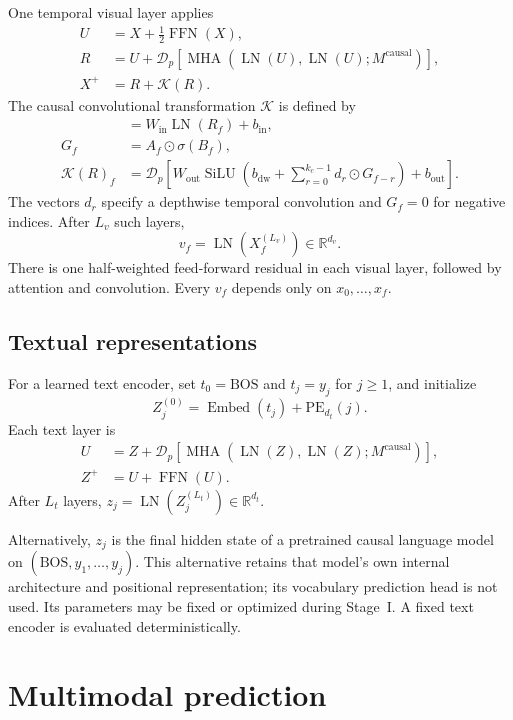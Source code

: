 \documentclass[11pt,a4paper]{article}
\newcommand{\R}{\mathbb{R}}
\newcommand{\LN}{\operatorname{LN}}
\newcommand{\MHA}{\operatorname{MHA}}
\newcommand{\FFN}{\operatorname{FFN}}
\newcommand{\silu}{\operatorname{SiLU}}
\newcommand{\BOS}{\mathrm{BOS}}
\numberwithin{equation}{section}
\begin{document}
One temporal visual layer applies
\begin{align}
U&=X+\tfrac12\FFN(X),\\
R&=U+\mathcal D_p\!\left[
 \MHA(\LN(U),\LN(U);M^{\mathrm{causal}})\right],\\
X^{+}&=R+\mathcal K(R).
\label{eq:visual-layer}
\end{align}
The causal convolutional transformation $\mathcal K$ is defined by
\begin{align}
[A_f,B_f]&=W_{\mathrm{in}}\LN(R_f)+b_{\mathrm{in}},\\
G_f&=A_f\odot\sigma(B_f),\\
\mathcal K(R)_f
 &=\mathcal D_p\!\left[
 W_{\mathrm{out}}\silu\!\left(
 b_{\mathrm{dw}}+\sum_{r=0}^{k_c-1}d_r\odot G_{f-r}\right)
 +b_{\mathrm{out}}\right].
\end{align}
The vectors $d_r$ specify a depthwise temporal convolution and
$G_f=0$ for negative indices. After $L_v$ such layers,
\begin{equation}
v_f=\LN(X_f^{(L_v)})\in\R^{d_v}.
\end{equation}
There is one half-weighted feed-forward residual in each visual layer,
followed by attention and convolution. Every $v_f$ depends only on
$x_0,\ldots,x_f$.

\subsection{Textual representations}

For a learned text encoder, set $t_0=\BOS$ and $t_j=y_j$ for $j\geq1$,
and initialize
\begin{equation}
Z_j^{(0)}=\operatorname{Embed}(t_j)+\mathrm{PE}_{d_t}(j).
\end{equation}
Each text layer is
\begin{align}
U&=Z+\mathcal D_p\!\left[
 \MHA(\LN(Z),\LN(Z);M^{\mathrm{causal}})\right],\\
Z^{+}&=U+\FFN(U).
\end{align}
After $L_t$ layers, $z_j=\LN(Z_j^{(L_t)})\in\R^{d_t}$.

Alternatively, $z_j$ is the final hidden state of a pretrained causal
language model on $(\BOS,y_1,\ldots,y_j)$. This alternative retains
that model's own internal architecture and positional representation;
its vocabulary prediction head is not used. Its parameters may be
fixed or optimized during Stage~I. A fixed text
encoder is evaluated deterministically.

\section{Multimodal prediction}
\end{document}
